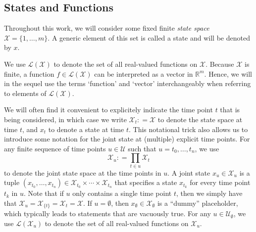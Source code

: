 \documentclass[10pt,a4paper]{paper}
\theoremstyle{definition}
\newcommand{\reals}{\mathbb{R}}
\newcommand{\states}{\mathcal{X}}
\newcommand{\gambles}{\mathcal{L}}
\newcommand{\gamblesX}{\gambles(\states)}
\newcommand{\coloneqq}{:\!=}
\begin{document}
\subsection{States and Functions}\label{sec:multivar_notation}

Throughout this work, we will consider some fixed finite \emph{state space} $\states=\{1,\dots,m\}$. A generic element of this set is called a state and will be denoted by $x$.

We use $\gamblesX$ to denote the set of all real-valued functions on $\states$. Because $\states$ is finite, a function $f\in\gamblesX$ can be interpreted as a vector in $\reals^m$. Hence, we will in the sequel use the terms `function' and `vector' interchangeably when referring to elements of $\gamblesX$.

We will often find it convenient to explicitely indicate the time point $t$ that is being considered, in which case we write $\states_t\coloneqq\states$ to denote the state space at time $t$, and $x_t$ to denote a state at time $t$. This notational trick also allows us to introduce some notation for the joint state at (multiple) explicit time points. For any finite sequence of time points $u\in\mathcal{U}$ such that $u=t_0,\ldots,t_n$, we use
\begin{equation*}
\states_u \coloneqq \prod_{t\in u}\states_t
\end{equation*}
to denote the joint state space at the time points in $u$. A joint state $x_u\in\states_u$ is a tuple $(x_{t_0},\ldots,x_{t_n})\in\states_{t_0}\times\cdots\times\states_{t_n}$ that specifies a state $x_{t_k}$ for every time point $t_k$ in $u$. Note that if $u$ only contains a single time point $t$, then we simply have that $\states_u=\states_{\{t\}}=\states_t=\states$. If $u=\emptyset$, then $x_\emptyset\in\states_\emptyset$ is a ``dummy'' placeholder, which typically leads to statements that are vacuously true. 
For any $u\in\mathcal{U}_\emptyset$, we use $\gambles(\states_u)$ to denote the set of all real-valued functions on $\states_u$. 

\end{document}
